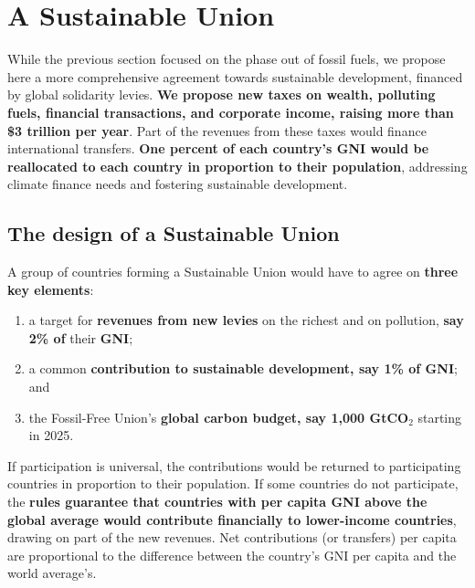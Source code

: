\documentclass[12pt,english]{article}
\begin{document}
\clearpage

\section{A Sustainable Union\label{sec:su}}

While the previous section focused on the phase out of fossil fuels, we propose here a more comprehensive agreement towards sustainable development, financed by global solidarity levies.\textbf{ We propose new taxes on wealth, polluting fuels, financial transactions, and corporate income, raising more than \$3 trillion per year}. Part of the revenues from these taxes would finance international transfers. \textbf{One percent of each country's GNI would be reallocated to each country in proportion to their population}, addressing climate finance needs and fostering sustainable development.

\subsection{The design of a Sustainable Union\label{subsec:principles_sa}}

A group of countries forming a Sustainable Union would have to agree on \textbf{three key elements}:
\begin{enumerate}
  \item a target for \textbf{revenues from new levies} on the richest and on pollution, \textbf{say 2\% of} their \textbf{GNI};
  \item a common \textbf{contribution to sustainable development, say 1\% of GNI}; and
  \item the Fossil-Free Union's \textbf{global carbon budget, say 1,000 GtCO$_\text{2}$} starting in 2025.
\end{enumerate}

If participation is universal, the contributions would be returned to participating countries in proportion to their population. If some countries do not participate, 
the\textbf{ rules guarantee that countries with per capita GNI above the global average would contribute financially to lower-income countries}, drawing on part of the new revenues. Net contributions (or transfers) per capita are proportional to the difference between the country's GNI per capita and the world average's.
\end{document}
